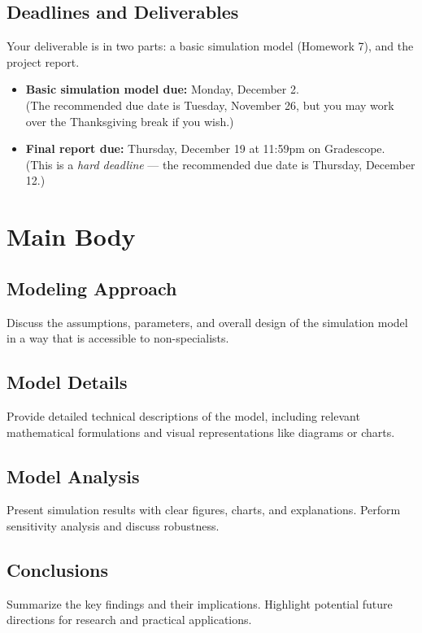 \documentclass[12pt]{article}
\begin{document}
\subsection{Deadlines and Deliverables}
Your deliverable is in two parts: a basic simulation model (Homework 7), and the project report.

\begin{itemize}
    \item \textbf{Basic simulation model due:} Monday, December 2. \\
    (The recommended due date is Tuesday, November 26, but you may work over the Thanksgiving break if you wish.)
    \item \textbf{Final report due:} Thursday, December 19 at 11:59pm on Gradescope. \\
    (This is a \textit{hard deadline} — the recommended due date is Thursday, December 12.)
\end{itemize}

\vspace{2em}

\section{Main Body}
\subsection{Modeling Approach}
Discuss the assumptions, parameters, and overall design of the simulation model in a way that is accessible to non-specialists.

\subsection{Model Details}
Provide detailed technical descriptions of the model, including relevant mathematical formulations and visual representations like diagrams or charts.

\subsection{Model Analysis}
Present simulation results with clear figures, charts, and explanations. Perform sensitivity analysis and discuss robustness.

\subsection{Conclusions}
Summarize the key findings and their implications. Highlight potential future directions for research and practical applications.
\end{document}
